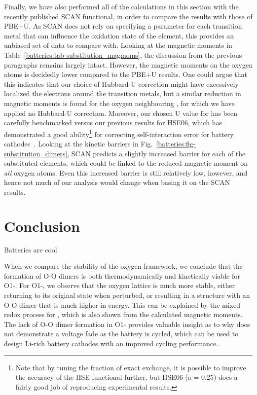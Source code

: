 \begin{refsection}
Finally, we have also performed all of the calculations in this section with the recently published SCAN functional, in order to compare the results with those of PBE+U. As SCAN does not rely on specifying a parameter for each transition metal that can influence the oxidation state of the element, this provides an unbiased set of data to compare with. Looking at the magnetic moments in Table~\ref{batteries:tab-substitution_magmoms}, the discussion from the previous paragraphs remains largely intact. However, the magnetic moments on the oxygen atoms is decidedly lower compared to the PBE+U results. One could argue that this indicates that our choice of Hubbard-U correction might have excessively localized the electrons around the transition metals, but a similar reduction in magnetic moments is found for the oxygen neighbouring , for which we have applied no Hubbard-U correction. Moreover, our chosen U value for  has been carefully benchmarked versus our previous results for HSE06, which has demonstrated a good ability\footnote{Note that by tuning the fraction of exact exchange, it is possible to improve the accuracy of the HSE functional further, but HSE06 (a = 0.25) does a fairly good job of reproducing experimental results.} for correcting self-interaction error for battery cathodes~\cite{Seo2015}. Looking at the kinetic barriers in Fig.~\ref{batteries:fig-substitution_dimers}, SCAN predicts a slightly increased barrier for each of the substituted elements, which could be linked to the reduced magnetic moment on \textit{all} oxygen atoms. Even this increased barrier is still relatively low, however, and hence not much of our analysis would change when basing it on the SCAN results.

\section{Conclusion}


Batteries are cool

When we compare the stability of the oxygen framework, we conclude that the formation of O-O dimers is both thermodynamically and kinetically viable for O1-. For O1-, we observe that the oxygen lattice is much more stable, either returning to its original state when perturbed, or resulting in a structure with an O-O dimer that is much higher in energy. This can be explained by the mixed redox process for , which is also shown from the calculated magnetic moments. The lack of O-O dimer formation in O1- provides valuable insight as to why  does not demonstrate a voltage fade as the battery is cycled, which can be used to design Li-rich battery cathodes with an improved cycling performance.


\end{refsection}
